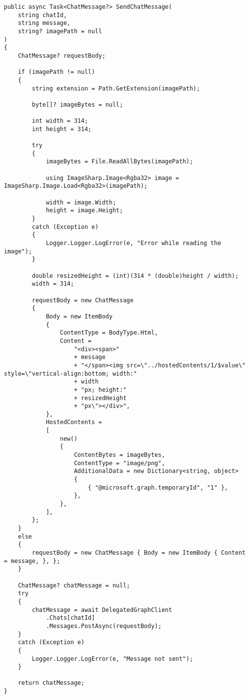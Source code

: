 \begin{lstlisting}
public async Task<ChatMessage?> SendChatMessage(
	string chatId,
	string message,
	string? imagePath = null
)
{
	ChatMessage? requestBody;

	if (imagePath != null)
	{
		string extension = Path.GetExtension(imagePath);

		byte[]? imageBytes = null;

		int width = 314;
		int height = 314;

		try
		{
			imageBytes = File.ReadAllBytes(imagePath);

			using ImageSharp.Image<Rgba32> image = ImageSharp.Image.Load<Rgba32>(imagePath);

			width = image.Width;
			height = image.Height;
		}
		catch (Exception e)
		{
			Logger.Logger.LogError(e, "Error while reading the image");
		}

		double resizedHeight = (int)(314 * (double)height / width);
		width = 314;

		requestBody = new ChatMessage
		{
			Body = new ItemBody
			{
				ContentType = BodyType.Html,
				Content =
					"<div><span>"
					+ message
					+ "</span><img src=\"../hostedContents/1/$value\" style=\"vertical-align:bottom; width:"
					+ width
					+ "px; height:"
					+ resizedHeight
					+ "px\"></div>",
			},
			HostedContents =
			[
				new()
				{
					ContentBytes = imageBytes,
					ContentType = "image/png",
					AdditionalData = new Dictionary<string, object>
					{
						{ "@microsoft.graph.temporaryId", "1" },
					},
				},
			],
		};
	}
	else
	{
		requestBody = new ChatMessage { Body = new ItemBody { Content = message, }, };
	}

	ChatMessage? chatMessage = null;
	try
	{
		chatMessage = await DelegatedGraphClient
			.Chats[chatId]
			.Messages.PostAsync(requestBody);
	}
	catch (Exception e)
	{
		Logger.Logger.LogError(e, "Message not sent");
	}

	return chatMessage;
}
\end{lstlisting}